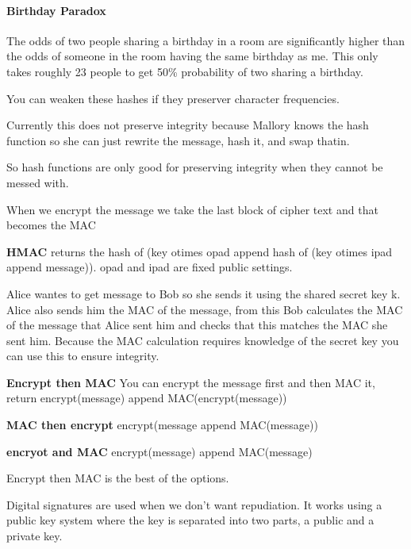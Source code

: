 \documentclass{article}
\begin{document}
\paragraph{Birthday Paradox} %
\label{par:birthday_paradox}
The odds of two people sharing a birthday in a room are significantly higher than the odds of someone in the room having the same birthday as me. This only takes roughly 23 people to get 50\% probability of two sharing a birthday.

You can weaken these hashes if they preserver character frequencies. 


Currently this does not preserve integrity because Mallory knows the hash function so she can just rewrite the message, hash it, and swap thatin.



So hash functions are only good for preserving integrity when they cannot be messed with. 


When we encrypt the message we take the last block of cipher text and that becomes the MAC

\textbf{HMAC} returns the hash of (key otimes opad append hash of (key otimes ipad append message)). opad and ipad are fixed public settings.


Alice wantes to get message to Bob so she sends it using the shared secret key k. Alice also sends him the MAC of the message, from this Bob calculates the MAC of the message that Alice sent him and checks that this matches the MAC she sent him. Because the MAC calculation requires knowledge of the secret key you can use this to ensure integrity.


\textbf{Encrypt then MAC} You can encrypt the message first and then MAC it, return encrypt(message) append MAC(encrypt(message))

\textbf{MAC then encrypt} encrypt(message append MAC(message))

\textbf{encryot and MAC} encrypt(message) append MAC(message)

Encrypt then MAC is the best of the options.




Digital signatures are used when we don't want repudiation. It works using a public key system where the key is separated into two parts, a public and a private key.
\end{document}
